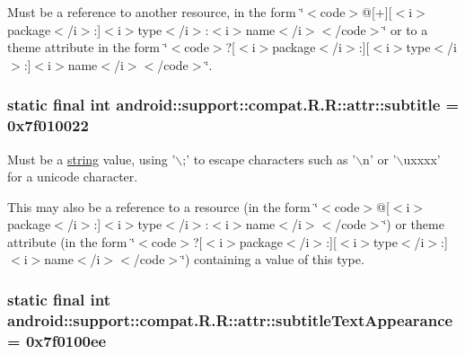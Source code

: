 Must be a reference to another resource, in the form \char`\"{}$<$code$>$@\mbox{[}+\mbox{]}\mbox{[}$<$i$>$package$<$/i$>$:\mbox{]}$<$i$>$type$<$/i$>$:$<$i$>$name$<$/i$>$$<$/code$>$\char`\"{} or to a theme attribute in the form \char`\"{}$<$code$>$?\mbox{[}$<$i$>$package$<$/i$>$:\mbox{]}\mbox{[}$<$i$>$type$<$/i$>$:\mbox{]}$<$i$>$name$<$/i$>$$<$/code$>$\char`\"{}. \hypertarget{classandroid_1_1support_1_1compat_1_1_r_1_1attr_5015517ba206a6bcc727c8b976d53af9}{
\subsubsection[{subtitle}]{\setlength{\rightskip}{0pt plus 5cm}static final int android::support::compat.R.R::attr::subtitle = 0x7f010022}}
\label{classandroid_1_1support_1_1compat_1_1_r_1_1attr_5015517ba206a6bcc727c8b976d53af9}


Must be a \hyperlink{classandroid_1_1support_1_1compat_1_1_r_1_1string}{string} value, using '$\backslash$;' to escape characters such as '$\backslash$n' or '$\backslash$uxxxx' for a unicode character. 

This may also be a reference to a resource (in the form \char`\"{}$<$code$>$@\mbox{[}$<$i$>$package$<$/i$>$:\mbox{]}$<$i$>$type$<$/i$>$:$<$i$>$name$<$/i$>$$<$/code$>$\char`\"{}) or theme attribute (in the form \char`\"{}$<$code$>$?\mbox{[}$<$i$>$package$<$/i$>$:\mbox{]}\mbox{[}$<$i$>$type$<$/i$>$:\mbox{]}$<$i$>$name$<$/i$>$$<$/code$>$\char`\"{}) containing a value of this type. \hypertarget{classandroid_1_1support_1_1compat_1_1_r_1_1attr_8881eefa1aef00b1729fa1ffffd51de0}{
\subsubsection[{subtitleTextAppearance}]{\setlength{\rightskip}{0pt plus 5cm}static final int android::support::compat.R.R::attr::subtitleTextAppearance = 0x7f0100ee}}
\label{classandroid_1_1support_1_1compat_1_1_r_1_1attr_8881eefa1aef00b1729fa1ffffd51de0}



